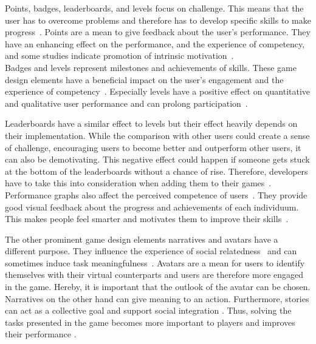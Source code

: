 Points, badges, leaderboards, and levels focus on challenge. This means that the user has to overcome problems and therefore has to develop specific skills to make progress~\cite{actionableGamification}. Points are a mean to give feedback about the user's performance. They have an enhancing effect on the performance, and the experience of competency, and some studies indicate promotion of intrinsic motivation~\cite{wirkungGamificationBuch, intrinsicMotivation}.\\
Badges and levels represent milestones and achievements of skills. These game design elements have a beneficial impact on the user's engagement and the experience of competency~\cite{wirkungGamificationBuch}. Especially levels have a positive effect on quantitative and qualitative user performance and can prolong participation~\cite{intrinsicMotivation}.\par
Leaderboards have a similar effect to levels but their effect heavily depends on their implementation. While the comparison with other users could create a sense of challenge, encouraging users to become better and outperform other users, it can also be demotivating. This negative effect could happen if someone gets stuck at the bottom of the leaderboards without a chance of rise. Therefore, developers have to take this into consideration when adding them to their games~\cite{wirkungGamificationBuch, actionableGamification, gamificationMotivation}.\\ Performance graphs also affect the perceived competence of users~\cite{wirkungGamificationBuch, gamificationMotivation}. They provide good visual feedback about the progress and achievements of each individuum. This makes people feel smarter and motivates them to improve their skills~\cite{gamificationMotivation}.\par
The other prominent game design elements narratives and avatars have a different purpose. They influence the experience of social relatedness~\cite{gamificationMotivation} and can sometimes induce task meaningfulness~\cite{wirkungGamificationBuch}.
Avatars are a mean for users to identify themselves with their virtual counterparts and users are therefore more engaged in the game. Hereby, it is important that the outlook of the avatar can be chosen. Narratives on the other hand can give meaning to an action. Furthermore, stories can act as a collective goal and support social integration \cite{wirkungGamificationBuch}. Thus, solving the tasks presented in the game becomes more important to players and improves their performance \cite{intrinsicMotivation}.\par
